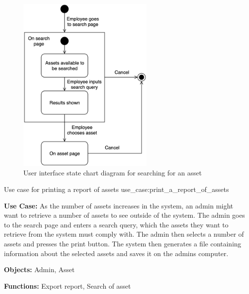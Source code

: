 \begin{figure}[H]
    \centering
    \includegraphics[width=0.6\textwidth]{figures/UseCases/UC_Search_asset.png}
    \caption{User interface state chart diagram for searching for an asset}
    \label{fig:search_asset_statechart}
\end{figure}

    {Use case for printing a report of assets}
    {use_case:print_a_report_of_assets}
    {
        \textbf{Use Case:} As the number of assets increases in the system, an admin might want to retrieve a number of assets to see outside of the system. The admin goes to the search page and enters a search query, which the assets they want to retrieve from the system must comply with. The admin then selects a number of assets and presses the print button. The system then generates a file containing information about the selected assets and saves it on the admins computer.
    
        \vskip 0.2cm
        
        \textbf{Objects:} Admin, Asset
        
        \vskip 0.2cm
        
        \textbf{Functions:} Export report, Search of asset
    }

